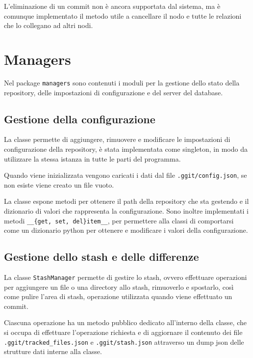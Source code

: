 L'eliminazione di un commit non è ancora supportata dal sistema, ma è comunque implementato il metodo utile a cancellare il nodo e tutte le relazioni che lo collegano ad altri nodi.

\section{Managers}

Nel package \texttt{managers} sono contenuti i moduli per la gestione dello stato della repository, delle impostazioni di configurazione e del server del database.



\subsection{Gestione della configurazione}
La classe  permette di aggiungere, rimuovere e modificare le impostazioni di configurazione della repository, è stata implementata come singleton, in modo da utilizzare la stessa istanza in tutte le parti del programma.

Quando viene inizializzata vengono caricati i dati dal file \texttt{.ggit/config.json}, se non esiste viene creato un file vuoto.

La classe espone metodi per ottenere il path della repository che sta gestendo e il dizionario di valori che rappresenta la configurazione. Sono inoltre implementati i metodi \texttt{\_\_\{get, set, del\}item\_\_}, per permettere alla classi di comportarsi come un dizionario python per ottenere e modificare i valori della configurazione.

\subsection{Gestione dello stash e delle differenze}
La classe \texttt{StashManager} permette di gestire lo stash, ovvero effettuare operazioni per aggiungere un file o una directory allo stash, rimuoverlo e spostarlo, così come pulire l'area di stash, operazione utilizzata quando viene effettuato un commit.

Ciascuna operazione ha un metodo pubblico dedicato all'interno della classe, che si occupa di effettuare l'operazione richiesta e di aggiornare il contenuto dei file \texttt{.ggit/tracked\_files.json} e \texttt{.ggit/stash.json} attraverso un dump json delle strutture dati interne alla classe.

